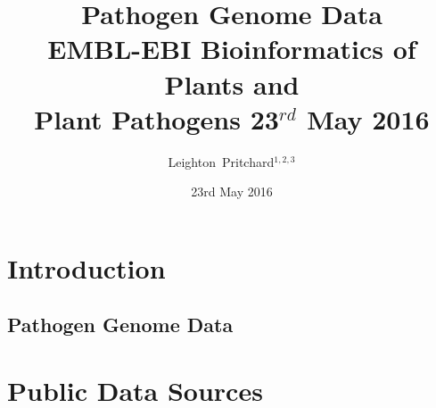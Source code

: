 

%



\title[Pathogen Genome Data] %
{Pathogen Genome Data \\
{\small EMBL-EBI Bioinformatics of Plants and \\ Plant Pathogens 23$^{rd}$ May 2016}}
\author[Leighton Pritchard] %
{Leighton~Pritchard$^{1,2,3}$}
\date[23rd May 2016] %
{23rd May 2016}
\subject{Bioinformatics, Genomics, Plant Pathogens, Plants, Microbiology, Microbes, Comparative Genomics, Visualisation}





\frame[plain]{\titlepage}



\section{Introduction}

\subsection{Pathogen Genome Data}


\section{Public Data Sources}

